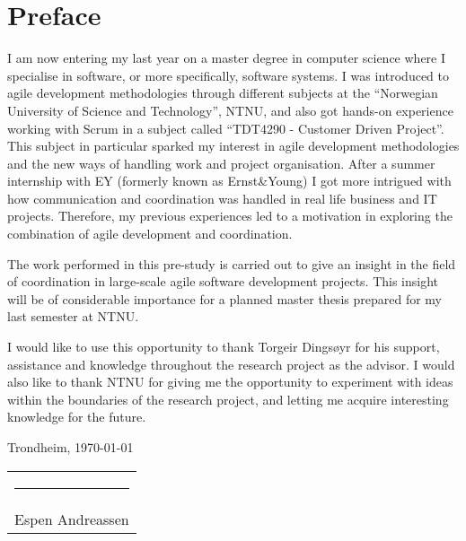 \chapter*{Preface}

I am now entering my last year on a master degree in computer science where I specialise in software, or more specifically, software systems. I was introduced to agile development methodologies through different subjects at the ``Norwegian University of Science and Technology'', NTNU, and also got hands-on experience working with Scrum in a subject called ``TDT4290 - Customer Driven Project''. This subject in particular sparked my interest in agile development methodologies and the new ways of handling work and project organisation. After a summer internship with EY (formerly known as Ernst\&Young) I got more intrigued with how communication and coordination was handled in real life business and IT projects. Therefore, my previous experiences led to a motivation in exploring the combination of agile development and coordination.

The work performed in this pre-study is carried out to give an insight in the field of coordination in large-scale agile software development projects. This insight will be of considerable importance for a planned master thesis prepared for my last semester at NTNU.

I would like to use this opportunity to thank Torgeir Dingsøyr for his support, assistance and knowledge throughout the research project as the advisor. I would also like to thank NTNU for giving me the opportunity to experiment with ideas within the boundaries of the research project, and letting me acquire interesting knowledge for the future.

\vspace{1.5cm}

Trondheim, \today

\newcommand{\singleSignature}[1]{
\vspace{0.5cm}


\noindent


    \vspace{0.5cm}

    \begin{tabular}{l}
    \rule{6cm}{1pt}\\
    #1
    \end{tabular}

\vspace{1cm}
}

\singleSignature{Espen Andreassen}